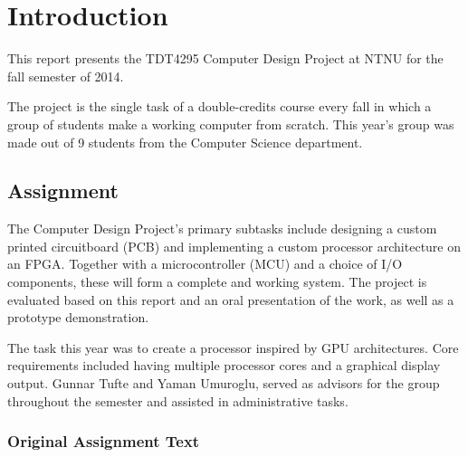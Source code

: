 \documentclass[../main/report.tex]{subfiles}
\begin{document}
\chapter{Introduction}
\label{sec:intro}

This report presents the TDT4295 Computer Design Project at NTNU for the fall semester of 2014.

The project is the single task of a double-credits course every fall in which a group of students make a working computer from scratch.
This year's group was made out of 9 students from the Computer Science department.

\section{Assignment}

The Computer Design Project's primary subtasks include designing a custom printed circuitboard (PCB) and  implementing a custom processor architecture on an FPGA.
Together with a microcontroller (MCU) and a choice of I/O components, these will form a complete and working system.
The project is evaluated based on this report and an oral presentation of the work, as well as a prototype demonstration.

The task this year was to create a processor inspired by GPU architectures.
Core requirements included having multiple processor cores and a graphical display output.
Gunnar Tufte and Yaman Umuroglu, served as advisors for the group throughout the semester and assisted in administrative tasks.

\newpage

\subsection{Original Assignment Text}
\end{document}
